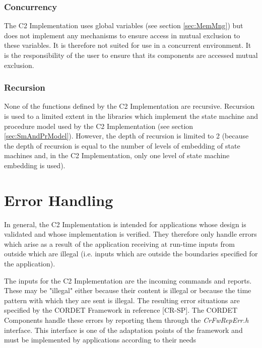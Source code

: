 \documentclass{pnp_article}
\begin{document}
\subsubsection{Concurrency}
The C2 Implementation uses global variables (see section \ref{sec:MemMng}) but does not implement any mechanisms to ensure access in mutual exclusion to these variables. It is therefore not suited for use in a concurrent environment. It is the responsibility of the user to ensure that its components are accessed mutual exclusion.

\subsubsection{Recursion}
None of the functions defined by the C2 Implementation are recursive. Recursion is used to a limited extent in the libraries which implement the state machine and procedure model used by the C2 Implementation (see section \ref{sec:SmAndPrModel}). However, the depth of recursion is limited to 2 (because the depth of recursion is equal to the number of levels of embedding of state machines and, in the C2 Implementation, only one level of state machine embedding is used).  


\section{Error Handling}\label{sec:ErrHandling}

In general, the C2 Implementation is intended for applications whose design is validated and whose implementation is verified. They therefore only handle errors which arise as a result of the application receiving at run-time inputs from outside which are illegal (i.e. inputs which are outside the boundaries specified for the application). 

The inputs for the C2 Implementation are the incoming commands and reports. These may be "illegal" either because their content is illegal or because the time pattern with which they are sent is illegal. The resulting error situations are specified by the CORDET Framework in reference [CR-SP]. The CORDET Components handle these errors by reporting them through the \textit{CrFwRepErr.h} interface. This interface is one of the adaptation points of the framework and must be implemented by applications according to their needs 
\end{document}
